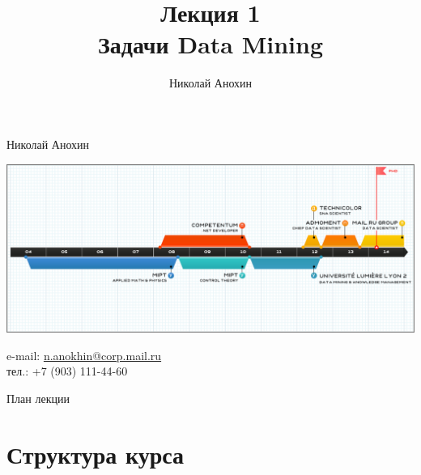 \documentclass[10pt]{beamer}
\author{Николай Анохин}
\title{\newline \newline \newline Лекция 1 \\ Задачи Data Mining}
\let\otp\titlepage
\renewcommand{\titlepage}{\otp\addtocounter{framenumber}{-1}}
\begin{document}
\begin{frame}[plain]
\titlepage
\end{frame}

\begin{frame}{Николай Анохин}

\begin{center}
\includegraphics[scale=0.325]{images/timeline.png}
\end{center}

\begin{footnotesize}
e-mail: \href{mailto:n.anokhin@corp.mail.ru}{n.anokhin@corp.mail.ru} \\
тел.: +7 (903) 111-44-60
\end{footnotesize}

\end{frame}

\begin{frame}{План лекции}
\tableofcontents
\end{frame}

\section{Структура курса} %
\end{document}
